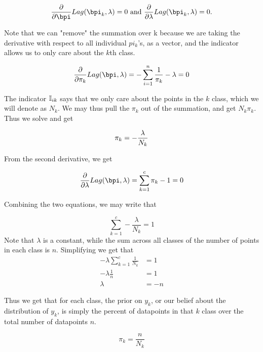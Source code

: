 \documentclass[submit]{harvardml}
\newenvironment{answer}{%
    \color{answergreen}\bf}
  {%
  }
\begin{document}
\begin{enumerate}
\begin{answer}
        \begin{equation*}
            \frac{\partial}{\partial \bpi} Lag(\bpi_k,\lambda)=0 \text{ and }
        \frac{\partial}{\partial\lambda} Lag(\bpi_k, \lambda)= 0.
        \end{equation*}
        
        Note that we can "remove" the summation over k because we are taking the
        derivative with respect to all individual $pi_k$'s, as a vector, and the
        indicator allows us to only care about the $k$th class.

        $$
        \frac{\partial}{
            \partial \pi_k} Lag(\bpi,\lambda) = -\sum_{i=1}^n \frac{1}{\pi_k} - \lambda = 0
        $$

        The indicator $\mathbb{I}_{ik}$ says that we only care about the points in the $k$
        class, which we will denote as $N_k$. We may thus pull the $\pi_k$ out
        of the summation, and get $N_k \pi_k$. Thus we solve and get

        $$ \pi_k = - \frac{\lambda}{N_k} \\ $$

        From the second derivative, we get

        $$
        \frac{\partial}{
            \partial \lambda} Lag(\bpi,\lambda) =  \sum_{k=1}^c\pi_k-1 = 0
        $$

       Combining the two equations, we may write that 

        $$
        \sum_{k=1}^c - \frac{\lambda}{N_k}= 1
        $$
        Note that $\lambda$ is a constant, while the sum across all classes of the
        number of points in each class is $n$. Simplifying we get that 
        \begin{align*}
            -\lambda \sum_{k=1}^c \frac{1}{N_k} &= 1\\
            -\lambda \frac{1}{n} &= 1 \\
            \lambda &=  -n
        \end{align*}

        Thus we get that for each class, the prior on $y_k$, or our belief about
        the distribution of $y_k$, is simply the percent of datapoints in that
        $k$ class over the total number of datapoints $n$.

        $$ \pi_k = \frac{n}{N_k}
        $$

    \end{answer}
        


\end{enumerate}
\end{document}
